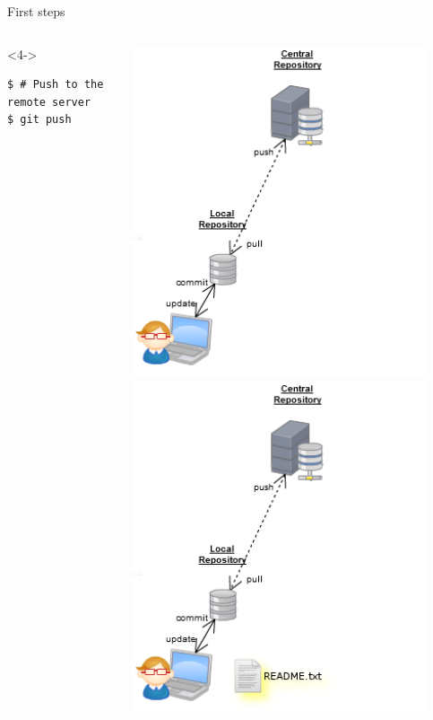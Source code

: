 \begin{frame}[fragile]{First steps}
\begin{columns}
\begin{column}{0.6\textwidth}
			\begin{onlyenv}<4->
			\begin{lstlisting}
$ # Push to the remote server
$ git push 
			\end{lstlisting}
			\end{onlyenv}
		\end{column}
		\begin{column}{0.4\textwidth}
			\begin{center}
				 {
					\includegraphics[width=0.9\textwidth]{empty.png}
				}\only<2> {
					\includegraphics[width=0.9\textwidth]{touch.png}
}
\end{center}
\end{column}
\end{columns}
\end{frame}
